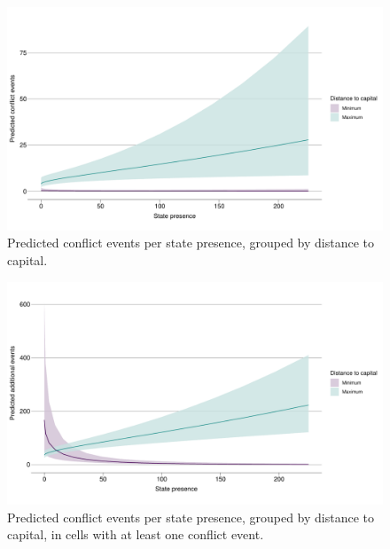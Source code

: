 \documentclass[12pt]{article}
\begin{document}
\begin{figure}[htpb]
	\centering
	\includegraphics[width=\linewidth]{"../R/Output/ggBothPlot.pdf"}
	\caption{Predicted conflict events per state presence, grouped by
	distance to capital.}
	\label{both_int}
\end{figure}

\begin{figure}[htpb]
	\centering
	\includegraphics[width=\linewidth]{"../R/Output/bothzinbplot.pdf"}
	\caption{Predicted conflict events per state presence, grouped by
	distance to capital, in cells with at least one conflict event.}
	\label{bothzinb_int}
\end{figure}

\end{document}
